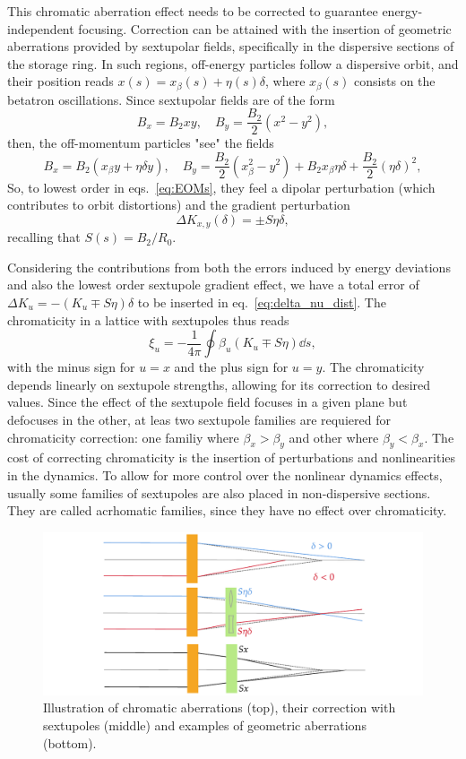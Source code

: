 This chromatic aberration effect needs to be corrected to guarantee energy-independent focusing. Correction can be attained with the insertion of geometric aberrations provided by sextupolar fields, specifically in the dispersive sections of the storage ring. In such regions, off-energy particles follow a dispersive orbit, and their position reads $x(s)=x_{\beta}(s)+\eta(s) \delta$, where $x_{\beta}(s)$ consists on the betatron oscillations. Since sextupolar fields are of the form
$$B_{x}=B_{2} x y, \quad B_{y}= \frac{B_{2}}{2}(x^{2}-y^{2}),$$
then, the off-momentum particles "see" the fields
$$B_{x}=B_{2}(x_\beta y + \eta \delta y), \quad B_{y}=\frac{B_{2}}{2}({x_\beta^{2}-y^{2}})+B_2 x_\beta \eta \delta + \frac{B_2}{2}(\eta \delta)^2,$$
So, to lowest order in eqs.~\eqref{eq:EOMs}, they feel a dipolar perturbation (which contributes to orbit distortions) and the gradient perturbation
$$\Delta K_{x,y}(\delta)=\pm S\eta \delta,$$
recalling that $S(s) = B_2 / R_0$.

Considering the contributions from both the errors induced by energy deviations and also the lowest order sextupole gradient effect, we have a total error of $\Delta K_u = -(K_u \mp S\eta)\delta$ to be inserted in eq.~\eqref{eq:delta_nu_dist}. The chromaticity in a lattice with sextupoles thus reads
\begin{equation}
    \xi_{u}=-\frac{1}{4\pi}\oint\beta_{u}(K_{u}\mp S\eta)\dd{s},
    \label{eq:chromaticity}
\end{equation}
with the minus sign for $u=x$ and the plus sign for $u=y$. The chromaticity depends linearly on sextupole strengths, allowing for its correction to desired values. Since the effect of the sextupole field focuses in a given plane but defocuses in the other, at leas two sextupole families are requiered for chromaticity correction: one familiy where $\beta_x > \beta_y$ and other where $\beta_y < \beta_x$. The cost of correcting chromaticity is the insertion of perturbations and nonlinearities in the dynamics. To allow for more control over the nonlinear dynamics effects, usually some families of sextupoles are also placed in non-dispersive sections. They are called acrhomatic families, since they have no effect over chromaticity.
\begin{figure}
    \centering
    \includegraphics[width=\textwidth]{Images/chromaticity.pdf}
    \caption{Illustration of chromatic aberrations (top), their correction with sextupoles (middle) and examples of geometric aberrations (bottom).}
    \label{fig:chromaticity}
\end{figure}

